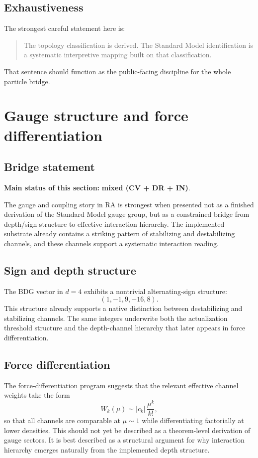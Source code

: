 \documentclass[11pt]{article}
\begin{document}
\subsection{Exhaustiveness}
The strongest careful statement here is:
\begin{quote}
The topology classification is derived. The Standard Model identification is a systematic interpretive mapping built on that classification.
\end{quote}
That sentence should function as the public-facing discipline for the whole particle bridge.

\section{Gauge structure and force differentiation}\label{sec:gauge}
\subsection{Bridge statement}
\textbf{Main status of this section:} \textbf{mixed (CV + DR + IN)}.

The gauge and coupling story in RA is strongest when presented not as a finished derivation of the Standard Model gauge group, but as a constrained bridge from depth/sign structure to effective interaction hierarchy. The implemented substrate already contains a striking pattern of stabilizing and destabilizing channels, and these channels support a systematic interaction reading.

\subsection{Sign and depth structure}
The BDG vector in $d=4$ exhibits a nontrivial alternating-sign structure:
\[
(1,-1,9,-16,8).
\]
This structure already supports a native distinction between destabilizing and stabilizing channels. The same integers underwrite both the actualization threshold structure and the depth-channel hierarchy that later appears in force differentiation.

\subsection{Force differentiation}
The force-differentiation program suggests that the relevant effective channel weights take the form
\[
W_k(\mu) \sim |c_k|\,\frac{\mu^k}{k!},
\]
so that all channels are comparable at $\mu\sim 1$ while differentiating factorially at lower densities. This should not yet be described as a theorem-level derivation of gauge sectors. It is best described as a structural argument for why interaction hierarchy emerges naturally from the implemented depth structure.
\end{document}
